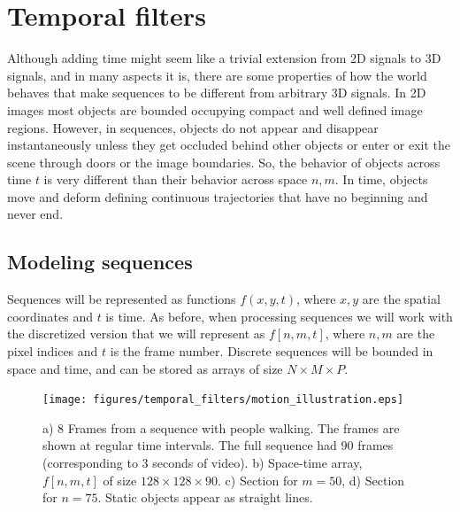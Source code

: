 

\chapter{Temporal filters}
\label{chapter:temporal_filters}



Although adding time might seem like a trivial extension from 2D signals to 3D signals, and in many aspects it is, there are some properties of how the world behaves that make sequences to be different from arbitrary 3D signals. In 2D images most objects are bounded occupying compact and well defined image regions. However, in sequences, objects do not appear and disappear instantaneously unless they get occluded behind other objects or enter or exit the scene through doors or the image boundaries. So, the behavior of objects across time $t$ is very different than their behavior across space $n,m$. In time, objects move and deform defining continuous trajectories that have no beginning and never end.



\section{Modeling sequences}
\label{sect:modelingSequences}

Sequences will be represented as functions $f (x,y,t)$, where $x,y$ are the spatial coordinates and $t$ is time. As before, when processing sequences we will work with the discretized version that we will represent as $f \left[n,m,t \right]$, where $n,m$ are the pixel indices and $t$ is the frame number. Discrete sequences will be bounded in space and time, and can be stored as arrays of size $N \times M \times P$.


\begin{figure}
    \texttt{[image: figures/temporal\_filters/motion\_illustration.eps]}
    \caption{a) 8 Frames from a sequence with people walking. The frames are shown at regular time intervals. The full sequence had 90 frames (corresponding to 3 seconds of video). b) Space-time array, $f \left[n,m,t \right]$ of size $128 \times 128 \times 90$. c) Section for $m=50$, d) Section for $n=75$. Static objects appear as straight lines.}
    \label{fig:motion}
\end{figure}

